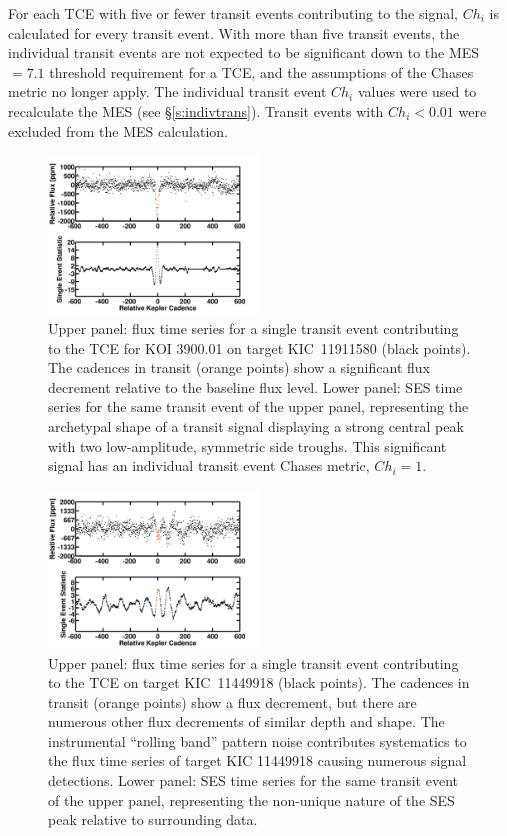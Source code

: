 For each TCE with five or fewer transit events contributing to the signal, $Ch_{i}$ is calculated for every transit event.  With more than five transit events, the individual transit events are not expected to be significant down to the MES$=7.1$ threshold requirement for a TCE, and the assumptions of the Chases metric no longer apply. The individual transit event $Ch_{i}$ values were used to recalculate the MES (see \S\ref{s:indivtrans}). Transit events with $Ch_{i}<0.01$ were excluded from the MES calculation.

\begin{figure}[ht!]
\includegraphics[width=0.5\textwidth]{kic11911580_cleanhighsnr.png}
\caption{Upper panel: flux time series for a single transit event contributing to the TCE for KOI 3900.01 on target KIC~11911580 (black points).  The cadences in transit (orange points) show a significant flux decrement relative to the baseline flux level.  Lower panel: SES time series for the same transit event of the upper panel, representing the archetypal shape of a transit signal displaying a strong central peak with two low-amplitude, symmetric side troughs.  This significant signal has an individual transit event Chases metric, $Ch_{i}=1$.}
\label{fig:chases1}
\end{figure}

\begin{figure}[h!]
\includegraphics[width=0.5\textwidth]{kic11449918_rb.png}
\caption{Upper panel: flux time series for a single transit event contributing to the TCE on target KIC~11449918 (black points).  The cadences in transit (orange points) show a flux decrement, but there are numerous other flux decrements of similar depth and shape.  The instrumental ``rolling band'' pattern noise contributes systematics to the flux time series of target KIC 11449918 causing numerous signal detections.  Lower panel: SES time series for the same transit event of the upper panel, representing the non-unique nature of the SES peak relative to surrounding data.}
\label{fig:chases2}
\end{figure}

